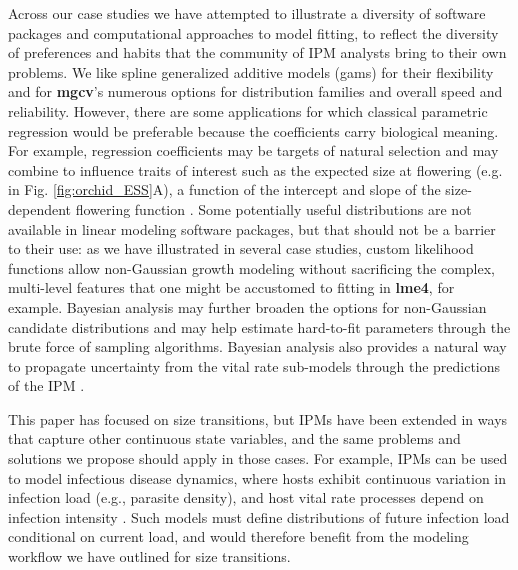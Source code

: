 \documentclass[12pt]{article}
\begin{document}
Across our case studies we have attempted to illustrate a diversity of software packages and computational approaches to model fitting, to reflect the diversity of preferences and habits that the community of IPM analysts bring to their own problems. 
We like spline generalized additive models (gams) for their flexibility and for \textbf{mgcv}'s numerous options for distribution families and overall speed and reliability. 
However, there are some applications for which classical parametric regression would be preferable because the coefficients carry biological meaning.
For example, regression coefficients may be targets of natural selection \citep{rees2016evolving} and may combine to influence traits of interest such as the expected size at flowering (e.g. in Fig. \ref{fig:orchid_ESS}A), a function of the intercept and slope of the size-dependent flowering function \citep{metcalf2003evolutionary}. 
Some potentially useful distributions are not available in linear modeling software packages, but that should not be a barrier to their use: as we have illustrated in several case studies, custom likelihood functions allow non-Gaussian growth modeling without sacrificing the complex, multi-level features that one might be accustomed to fitting in \textbf{lme4}, for example. 
Bayesian analysis may further broaden the options for non-Gaussian candidate distributions and may help estimate hard-to-fit parameters through the brute force of sampling algorithms. 
Bayesian analysis also provides a natural way to propagate uncertainty from the vital rate sub-models through the predictions of the IPM \citep{elderd2016quantifying}. 

This paper has focused on size transitions, but IPMs have been extended in ways that capture other continuous state variables, and the same problems and solutions we propose should apply in those cases. 
For example, IPMs can be used to model infectious disease dynamics, where hosts exhibit continuous variation in infection load (e.g., parasite density), and host vital rate processes depend on infection intensity \citep{metcalf2016opportunities,wilber2016integral}. 
Such models must define distributions of future infection load conditional on current load, and would therefore benefit from the modeling workflow we have outlined for size transitions.
\end{document}
